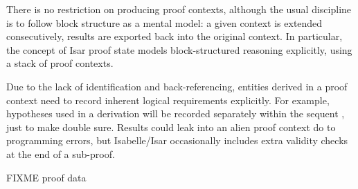 \begin{isabellebody}
\begin{isamarkuptext}
  There is no restriction on producing proof contexts, although the
  usual discipline is to follow block structure as a mental model: a
  given context is extended consecutively, results are exported back
  into the original context.  In particular, the concept of Isar proof
  state models block-structured reasoning explicitly, using a stack of
  proof contexts.

  Due to the lack of identification and back-referencing, entities
  derived in a proof context need to record inherent logical
  requirements explicitly.  For example, hypotheses used in a
  derivation will be recorded separately within the sequent \isa{{\isasymGamma}\ {\isasymturnstile}\ {\isasymphi}}, just to make double sure.  Results could leak into an alien
  proof context do to programming errors, but Isabelle/Isar
  occasionally includes extra validity checks at the end of a
  sub-proof.

  \medskip
  FIXME proof data

%
\end{isamarkuptext}%
\isamarkuptrue%
%
\isamarkuptrue%
%
\isadelimtheory
%
\endisadelimtheory
%
\isatagtheory
{}\isamarkupfalse%
%
\endisatagtheory
{\isafoldtheory}%
%
\isadelimtheory
%
\endisadelimtheory
\isanewline
\end{isabellebody}%

